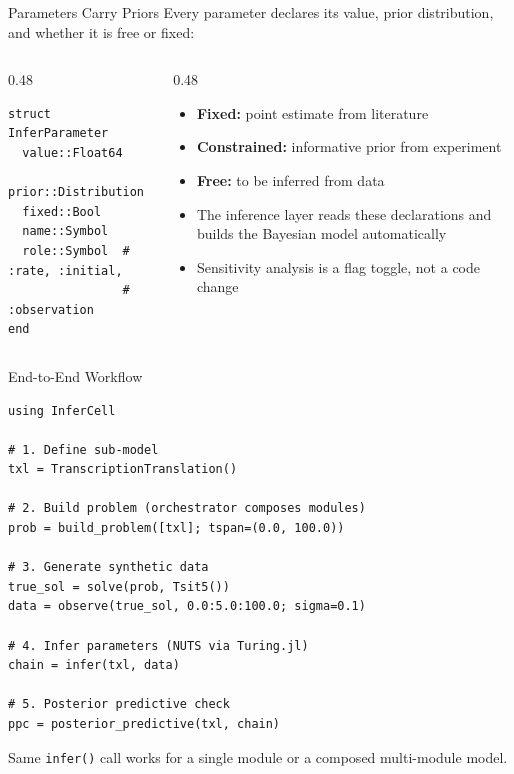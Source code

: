 \documentclass[aspectratio=169]{beamer}
\begin{document}
\begin{frame}[fragile]{Parameters Carry Priors}
	Every parameter declares its value, prior distribution, and whether it is free or fixed:

	\bigskip
	\begin{columns}[T]
		\begin{column}{0.48\textwidth}
			\begin{lstlisting}[style=julia]
struct InferParameter
  value::Float64
  prior::Distribution
  fixed::Bool
  name::Symbol
  role::Symbol  # :rate, :initial,
                # :observation
end
			\end{lstlisting}
		\end{column}
		\begin{column}{0.48\textwidth}
			\begin{itemize}\itemsep6pt
				\item \textbf{Fixed:} point estimate from literature
				\item \textbf{Constrained:} informative prior from experiment
				\item \textbf{Free:} to be inferred from data
				\item The inference layer reads these declarations and builds the Bayesian model automatically
				\item Sensitivity analysis is a flag toggle, not a code change
			\end{itemize}
		\end{column}
	\end{columns}
\end{frame}

\begin{frame}[fragile]{End-to-End Workflow}
	\begin{lstlisting}[style=julia]
using InferCell

# 1. Define sub-model
txl = TranscriptionTranslation()

# 2. Build problem (orchestrator composes modules)
prob = build_problem([txl]; tspan=(0.0, 100.0))

# 3. Generate synthetic data
true_sol = solve(prob, Tsit5())
data = observe(true_sol, 0.0:5.0:100.0; sigma=0.1)

# 4. Infer parameters (NUTS via Turing.jl)
chain = infer(txl, data)

# 5. Posterior predictive check
ppc = posterior_predictive(txl, chain)
	\end{lstlisting}

	\medskip
	{\small Same \texttt{infer()} call works for a single module or a composed multi-module model.}
\end{frame}
\end{document}
